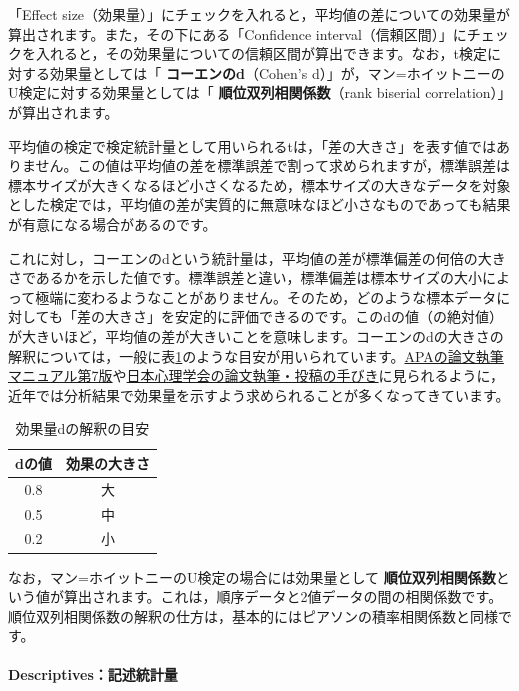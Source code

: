 \documentclass[
  12pt,
  a5jpaper,
  lualatex, ja=standard]{bxjsbook}
\renewcommand{\emph}[1]{\textbf{\color{emph} #1}}
\begin{document}
「Effect size（効果量）」にチェックを入れると，平均値の差についての効果量が算出されます。また，その下にある「Confidence interval（信頼区間）」にチェックを入れると，その効果量についての信頼区間が算出できます。なお，t検定に対する効果量としては「\emph{コーエンのd}（Cohen's d）」が，マン=ホイットニーのU検定に対する効果量としては「\emph{順位双列相関係数}（rank biserial correlation）」が算出されます。

平均値の検定で検定統計量として用いられるtは，「差の大きさ」を表す値ではありません。この値は平均値の差を標準誤差で割って求められますが，標準誤差は標本サイズが大きくなるほど小さくなるため，標本サイズの大きなデータを対象とした検定では，平均値の差が実質的に無意味なほど小さなものであっても結果が有意になる場合があるのです。

これに対し，コーエンのdという統計量は，平均値の差が標準偏差の何倍の大きさであるかを示した値です。標準誤差と違い，標準偏差は標本サイズの大小によって極端に変わるようなことがありません。そのため，どのような標本データに対しても「差の大きさ」を安定的に評価できるのです。このdの値（の絶対値）が大きいほど，平均値の差が大きいことを意味します。コーエンのdの大きさの解釈については，一般に表\ref{tab:ttests-d-cohen}のような目安が用いられています。\href{https://apastyle.apa.org/products/publication-manual-7th-edition}{APAの論文執筆マニュアル第7版}や\href{https://psych.or.jp/manual/}{日本心理学会の論文執筆・投稿の手びき}に見られるように，近年では分析結果で効果量を示すよう求められることが多くなってきています。

\begin{table}[H]

\caption{\label{tab:ttests-d-cohen}効果量dの解釈の目安}
\centering
\begin{tabular}[t]{cc}
\toprule
dの値 & 効果の大きさ\\
\midrule
0.8 & 大\\
0.5 & 中\\
0.2 & 小\\
\bottomrule
\end{tabular}
\end{table}

なお，マン=ホイットニーのU検定の場合には効果量として\emph{順位双列相関係数}という値が算出されます。これは，順序データと2値データの間の相関係数です。順位双列相関係数の解釈の仕方は，基本的にはピアソンの積率相関係数と同様です。

\hypertarget{descriptivesux8a18ux8ff0ux7d71ux8a08ux91cf}{%
\paragraph*{Descriptives：記述統計量}\label{descriptivesux8a18ux8ff0ux7d71ux8a08ux91cf}}
\end{document}
